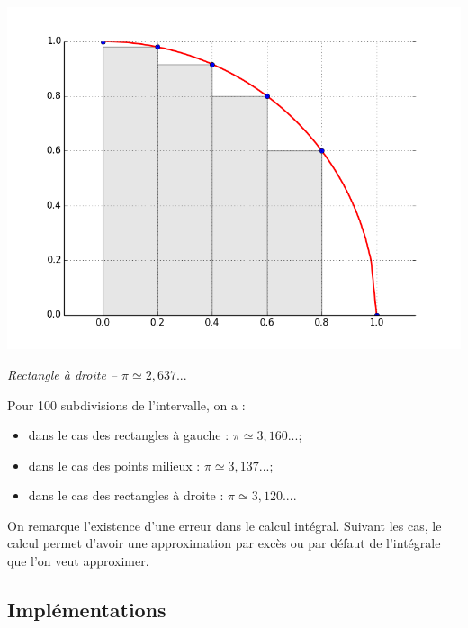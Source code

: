 \documentclass[10pt,fleqn]{article} %
\begin{document}
\begin{minipage}[c]{.32\linewidth}
\begin{center}
\includegraphics[width=.99\textwidth]{images/CourbesPython/pi_rect_d}

\textit{Rectangle à droite -- $\pi \simeq 2,637...$}
\end{center}
\end{minipage}

Pour 100 subdivisions de l'intervalle, on a :
\begin{itemize}
\item dans le cas des rectangles à gauche : $\pi\simeq 3,160...$;
\item dans le cas des points milieux : $\pi\simeq 3,137...$;
\item dans le cas des rectangles à droite : $\pi\simeq 3,120...$.
\end{itemize}


\begin{rem}
On remarque l'existence d'une erreur dans le calcul intégral. Suivant les cas, le calcul permet d'avoir une approximation par excès ou par défaut de l'intégrale que l'on veut approximer. 
\end{rem}



\subsection{Implémentations}
\end{document}
